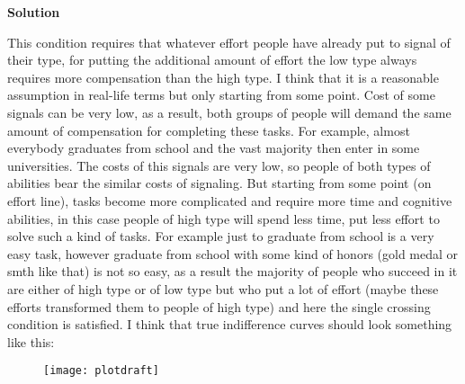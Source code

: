 \documentclass[a4paper]{article}
\begin{document}
			
			\textbf{Solution}
			
			This condition requires that whatever effort people have already put to signal of their type, for putting the additional amount of effort the low type always requires more compensation than the high type. I think that it is a reasonable assumption in real-life terms but only starting from some point. Cost of some signals can be very low, as a result, both groups of people will demand the same amount of compensation for completing these tasks. For example, almost everybody graduates from school and the vast majority then enter in some universities. The costs of this signals are very low, so people of both types of abilities bear the similar costs of signaling. But starting from some point (on effort line), tasks become more complicated and require more time and cognitive abilities, in this case people of high type will spend less time, put less effort to solve such a kind of tasks. For example just to graduate from school is a very easy task, however graduate from school with some kind of honors (gold medal or smth like that) is not so easy, as a result the majority of people who succeed in it are either of high type or of low type but who put a lot of effort (maybe these efforts transformed them to people of high type) and here the single crossing condition is satisfied. I think that true indifference curves should look something like this:
			 \begin{figure}[H]
			 	\centering
			 	\texttt{[image: plotdraft]}
			 	\caption{}\label{fig6}
			 \end{figure}
\end{document}
